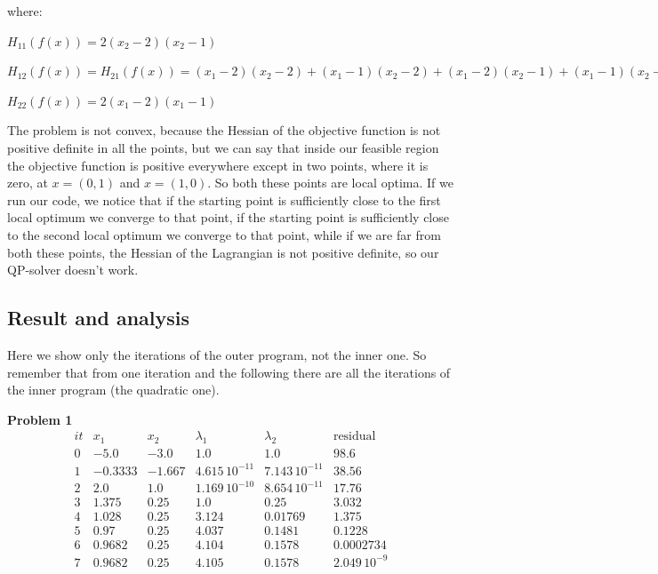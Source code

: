 \documentclass{article}
\begin{document}
where:

$H_{11}(f(x))= 2(x_2-2)(x_2-1)$

$H_{12}(f(x))=H_{21}(f(x))=(x_1-2)(x_2-2)+(x_1-1)(x_2-2)+(x_1-2)(x_2-1)+(x_1-1)(x_2-1)$

  $H_{22}(f(x))=    2(x_1-2)(x_1-1)$ 

\medskip

The problem is not convex, because the Hessian of the objective function is not positive definite in all the points, but we can say that inside our feasible region the objective function is positive everywhere except in two points, where it is zero, at $x=(0,1)$ and $x=(1,0)$.
So both these points are local optima.
If we run our code, we notice that if the starting point is sufficiently close to the first local optimum we converge to that point, if the starting point is sufficiently close to the second local optimum we converge to that point, while if we are far from both these points, the Hessian of the Lagrangian is not positive definite, so our QP-solver doesn't work.

\subsection{Result and analysis}

Here we show only the iterations of the outer program, not the inner one. So remember that from one iteration and the following there are all the iterations of the inner program (the quadratic one).

\bigskip

\textbf{Problem 1}
\[
\begin{array}{cccccc} 
it &  x_1 & x_2  & \lambda_1 & \lambda_2 & \text{residual}\\
\hline
0 & -5.0 & -3.0 & 1.0 & 1.0 & 98.6\\ 1 & -0.3333 & -1.667 & 4.615\,{10}^{-11} & 7.143\,{10}^{-11} & 38.56\\ 2 & 2.0 & 1.0 & 1.169\,{10}^{-10} & 8.654\,{10}^{-11} & 17.76\\ 3 & 1.375 & 0.25 & 1.0 & 0.25 & 3.032\\ 4 & 1.028 & 0.25 & 3.124 & 0.01769 & 1.375\\ 5 & 0.97 & 0.25 & 4.037 & 0.1481 & 0.1228\\ 6 & 0.9682 & 0.25 & 4.104 & 0.1578 & 0.0002734\\ 7 & 0.9682 & 0.25 & 4.105 & 0.1578 & 2.049\,{10}^{-9} \end{array}
\]
\end{document}
